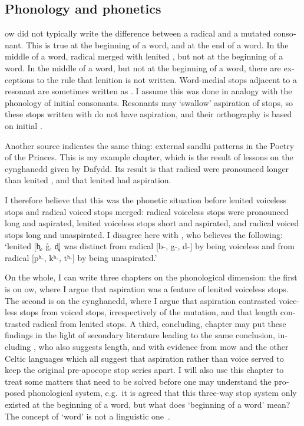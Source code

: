 \begin{english}
\section{Phonology and phonetics}
\Gls{ow} did not typically write the difference between a radical and a mutated consonant. This is true at the beginning of a word, and at the end of a word. In the middle of a word, radical  merged with lenited , but not at the beginning of a word. In the middle of a word, but not at the beginning of a word, there are exceptions to the rule that lenition is not written. Word-medial stops adjacent to a resonant are sometimes written as . I assume this was done in analogy with the phonology of initial consonants. Resonants may `swallow' aspiration of stops, so these stops written with  do not have aspiration, and their orthography is based on initial .

Another source indicates the same thing: external sandhi patterns in the Poetry of the Princes. This is my example chapter, which is the result of lessons on the cynghanedd given by Dafydd. Its result is that radical  were pronounced longer than lenited , and that lenited  had aspiration.

I therefore believe that this was the phonetic situation before lenited voiceless stops and radical voiced stops merged: radical voiceless stops were pronounced long and aspirated, lenited voiceless stops short and aspirated, and radical voiced stops long and unaspirated. I disagree here with \textcite[\S30]{koch_*cothairche_1990}, who believes the following: ‘lenited [b̥, g̊, d̥] was distinct from radical [b-, g-, d-] by being voiceless and from radical [pʰ-, kʰ-, tʰ-] by being unaspirated.’

On the whole, I can write three chapters on the phonological dimension: the first is on \gls{ow}, where I argue that aspiration was a feature of lenited voiceless stops. The second is on the cynghanedd, where I argue that aspiration contrasted voiceless stops from voiced stops, irrespectively of the mutation, and that length contrasted radical from lenited stops. A third, concluding, chapter may put these findings in the light of secondary literature leading to the same conclusion, including \textcite{falchun_systeme_1951}, who also suggests length, and with evidence from \gls{mow} and the other Celtic languages which all suggest that aspiration rather than voice served to keep the original pre-apocope stop series apart. I will also use this chapter to treat some matters that need to be solved before one may understand the proposed phonological system, e.g.\ it is agreed that this three-way stop system only existed at the beginning of a word, but what does `beginning of a word' mean? The concept of `word' is not a linguistic one~\autocite{haspelmath_indeterminacy_2011}.


\end{english}
